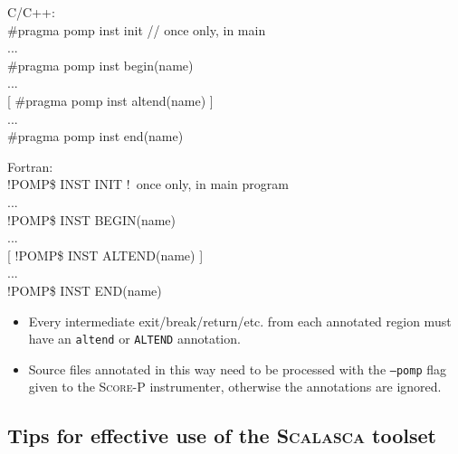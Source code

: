\documentclass[a4paper]{article}
\newcommand{\Scalasca}{\textsc{Scalasca}\xspace}
\newcommand{\Scorep}{\textsc{Score-P}\xspace}
\begin{document}
    \begin{minipage}[t]{0.5\linewidth}
      C/C++: \\\ttfamily
      \#pragma pomp inst init // once only, in main \\
      ... \\
      \#pragma pomp inst begin(name) \\
      \hspace*{2ex} ... \\
      \hspace*{2ex} [ \#pragma pomp inst altend(name) ] \\
      \hspace*{2ex} ... \\
      \#pragma pomp inst end(name)
    \end{minipage}
    \begin{minipage}[t]{0.5\linewidth}
      Fortran: \\\ttfamily
      !POMP\$ INST INIT !~once only, in main program \\
      ... \\
      !POMP\$ INST BEGIN(name) \\
      \hspace*{2ex} ... \\
      \hspace*{2ex} [ !POMP\$ INST ALTEND(name) ] \\
      \hspace*{2ex} ... \\
      !POMP\$ INST END(name)
    \end{minipage}

\begin{itemize}
  \item Every intermediate exit/break/return/etc.{} from each annotated region
must have an \texttt{altend} or \texttt{ALTEND} annotation.
  \item Source files annotated in this way need to be processed with the
\texttt{--pomp} flag given to the \Scorep instrumenter, otherwise the
annotations are ignored.
\end{itemize}


\clearpage




\subsection*{Tips for effective use of the \Scalasca toolset}
\end{document}
